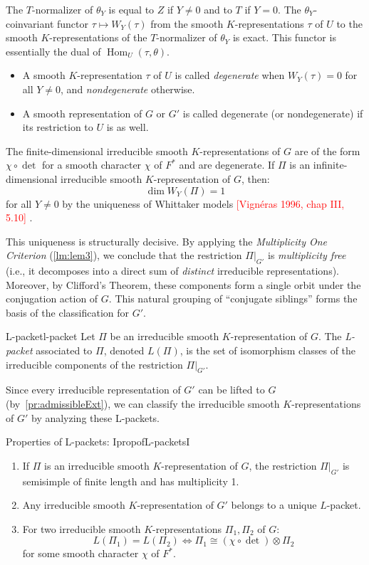 \documentclass{article}
\begin{document}
The $T$-normalizer of $\theta_Y$ is equal to $Z$ if $Y \neq 0$ and to $T$ if $Y=0$.
The $\theta_Y$-coinvariant functor $\tau \mapsto W_Y(\tau)$ from the smooth $K$-representations $\tau$ of $U$
to the smooth $K$-representations of the $T$-normalizer of $\theta_Y$ is exact. This functor is essentially the dual of $\operatorname{Hom}_U(\tau, \theta)$.
\begin{itemize}
    \item A smooth $K$-representation $\tau$ of $U$ is called \emph{degenerate} when $W_Y(\tau) = 0$ for all $Y \neq 0$, and \emph{nondegenerate} otherwise.
    \item A smooth representation of $G$ or $G'$ is called degenerate (or nondegenerate) if its restriction to $U$ is as well.
\end{itemize}

The finite-dimensional irreducible smooth $K$-representations of $G$ are of the form $\chi \circ \det$ for a smooth character $\chi$ of $F^*$ and are degenerate. If $\Pi$ is an infinite-dimensional irreducible smooth $K$-representation of $G$, then:
\[ \dim W_Y(\Pi) = 1 \]
for all $Y \neq 0$ by the uniqueness of Whittaker models \textcolor{red}{[Vignéras 1996, chap III, 5.10]} .

This uniqueness is structurally decisive. By applying the \emph{Multiplicity One Criterion} (\cref{lm:lem3}), we conclude that the restriction $\Pi|_{G'}$ is \emph{multiplicity free} (i.e., it
decomposes into a direct sum of \emph{distinct} irreducible representations). Moreover, by Clifford's Theorem,
these components form a single orbit under the conjugation action of $G$. This natural grouping of ``conjugate
siblings'' forms the basis of the classification for $G'$.

\begin{defn}{L-packet}{l-packet}
Let \(\Pi\) be an irreducible smooth \(K\)-representation of \(G\). The \emph{L-packet} associated to \(\Pi\), denoted \(L(\Pi)\), is the set of isomorphism classes of the irreducible components of the restriction \(\Pi|_{G'}\).
\end{defn}

Since every irreducible representation of \(G'\) can be lifted to \(G\) (by~\cref{pr:admissibleExt}), we can classify the irreducible smooth \(K\)-representations of \(G'\) by analyzing these L-packets.

\begin{prop}{Properties of L-packets: I}{propofL-packetsI}
  \begin{enumerate}
    \item If \(\Pi\) is an irreducible smooth \(K\)-representation of \(G\), the restriction \(\Pi|_{G'}\)
    is semisimple of finite length and has multiplicity 1.
    \item Any irreducible smooth \(K\)-representation of \(G'\) belongs to a unique \(L\)-packet.
    \item For two irreducible smooth \(K\)-representations \(\Pi_1, \Pi_2\) of \(G\):
    \[
      L(\Pi_1) = L(\Pi_2) \iff \Pi_1 \cong (\chi \circ \det) \otimes \Pi_2
    \]
    for some smooth character \(\chi\) of \(F^*\).
  \end{enumerate}
\end{prop}
\end{document}

